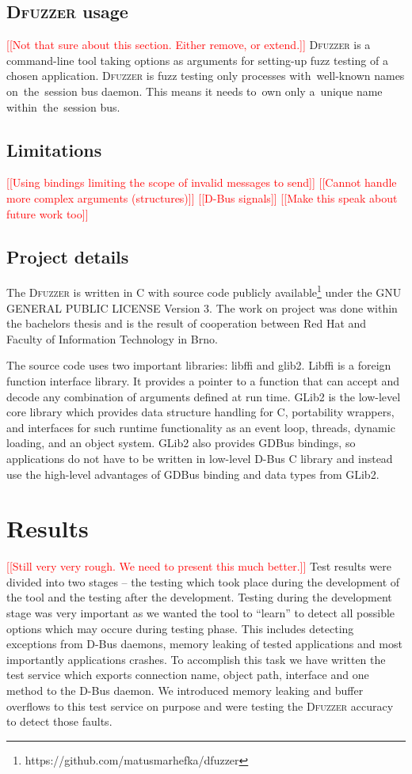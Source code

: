 \documentclass[conference]{IEEEtran}
\newcommand{\addtodo}[1]{\textcolor{red}{[[#1]]}}
\begin{document}
\subsection{\textsc{Dfuzzer} usage}
\addtodo{Not that sure about this section. Either remove, or extend.}
\textsc{Dfuzzer} is a command-line tool taking options as arguments for setting-up fuzz
testing of a chosen application. \textsc{Dfuzzer} is fuzz testing only processes
with~well-known names on~the~session bus daemon. This means it needs to~own
only a~unique name within~the~session bus.

\subsection{Limitations}
\addtodo{Using bindings limiting the scope of invalid messages to send}
\addtodo{Cannot handle more complex arguments (structures)}
\addtodo{D-Bus signals}
\addtodo{Make this speak about future work too}

\subsection{Project details}
The \textsc{Dfuzzer} is written in C with source code publicly
available\footnote{https://github.com/matusmarhefka/dfuzzer} under the GNU GENERAL
PUBLIC LICENSE Version 3. The work on project was done within the bachelors thesis
and is the result of cooperation between Red Hat and Faculty of Information
Technology in Brno.

The source code uses two important libraries: libffi and glib2.
Libffi is a foreign function interface library. It provides a pointer to a function
that can accept and decode any combination of arguments defined at run time.
GLib2 is the low-level core library which provides data structure handling for C,
portability wrappers, and interfaces for such runtime functionality as an event
loop, threads, dynamic loading, and an object system. GLib2 also provides GDBus
bindings, so applications do not have to be written in low-level D-Bus C library
and instead use the high-level advantages of GDBus binding and data types from GLib2.


\section{Results}
\addtodo{Still very very rough. We need to present this much better.}
Test results were divided into two stages -- the testing which took place during
the development of the tool and the testing after the development. Testing during
the development stage was very important as we wanted the tool to ``learn''
to detect all possible options which may occure during testing phase. This
includes detecting exceptions from D-Bus daemons, memory leaking of tested
applications and most importantly applications crashes. To accomplish this task
we have written the test service which exports connection name, object path,
interface and one method to the D-Bus daemon. We introduced memory leaking
and buffer overflows to this test service on purpose and were testing
the \textsc{Dfuzzer} accuracy to detect those faults.
\end{document}
